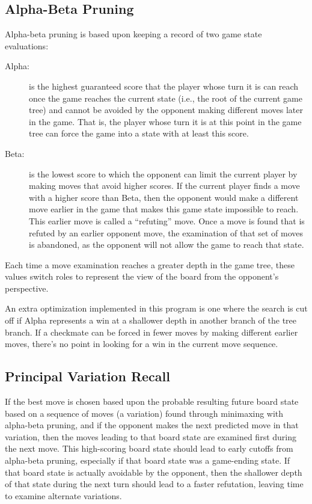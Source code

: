 \documentclass[letterpaper]{article}
\renewcommand{\_}{\allowbreak\textunderscore\allowbreak}
\begin{document}
\subsection{Alpha-Beta Pruning}

Alpha-beta pruning is based upon keeping a record of two game state evaluations:
\begin{description}
	\item[Alpha:] is the highest guaranteed score that the player whose turn it is can reach once the game reaches the current state (i.e., the root of the current game tree) and cannot be avoided by the opponent making different moves later in the game. That is, the player whose turn it is at this point in the game tree can force the game into a state with at least this score.
	\item[Beta:] is the lowest score to which the opponent can limit the current player by making moves that avoid higher scores. If the current player finds a move with a higher score than Beta, then the opponent would make a different move earlier in the game that makes this game state impossible to reach. This earlier move is called a ``refuting'' move. Once a move is found that is refuted by an earlier opponent move, the examination of that set of moves is abandoned, as the opponent will not allow the game to reach that state.
\end{description}
Each time a move examination reaches a greater depth in the game tree, these values switch roles to represent the view of the board from the opponent's perspective.

An extra optimization implemented in this program is one where the search is cut off if Alpha represents a win at a shallower depth in another branch of the tree branch. If a checkmate can be forced in fewer moves by making different earlier moves, there's no point in looking for a win in the current move sequence.

\subsection{Principal Variation Recall}

If the best move is chosen based upon the probable resulting future board state based on a sequence of moves (a variation) found through minimaxing with alpha-beta pruning, and if the opponent makes the next predicted move in that variation, then the moves leading to that board state are examined first during the next move. This high-scoring board state should lead to early cutoffs from alpha-beta pruning, especially if that board state was a game-ending state. If that board state is actually avoidable by the opponent, then the shallower depth of that state during the next turn should lead to a faster refutation, leaving time to examine alternate variations.
\end{document}
